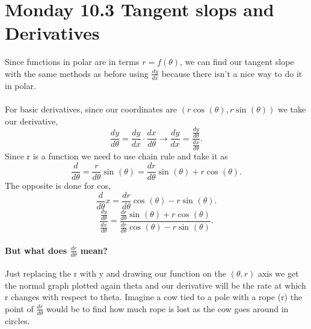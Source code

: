 \section{Monday 10.3 Tangent slops and Derivatives}%
\label{sec:Monday 10.3 Tangent slops and Derivatives}
Since functions in polar are in terms $ r=f\left( \theta \right)  $, we can find our tangent slope with the same methods as before using $ \frac{ dy }{ dx }  $ because there isn't a nice way to do it in polar.\\ \\

For basic derivatives, since our coordinates are $ \left( r\cos^{  } \left( \theta \right) , r\sin^{  } \left( \theta \right)  \right)  $ we take our derivative,
\[
\frac{ dy }{ d\theta} = \frac{ dy }{ dx } \cdot \frac{ dx }{ d\theta }  \to \frac{ dy }{ dx } = \frac{ \frac{ dy }{ d\theta }  }{ \frac{ dx }{ d\theta }  }
.\] 
Since r is a function we need to use chain rule and take it as
\[
\frac{ d }{ d\theta } = \frac{ r }{ d\theta } \sin^{  } \left( \theta \right) = \frac{ dr }{ d\theta } \sin^{  } \left( \theta \right) +r\cos^{  } \left( \theta \right)  
.\] 
The opposite is done for cos,
\[
\frac{ d }{ d\theta } x = \frac{ dr }{ d\theta } \cos^{  } \left( \theta \right) -r\sin^{  } \left( \theta \right) 
.\] 
\[
	\frac{ \frac{ dy }{ d\theta }  }{ \frac{ dx }{ d\theta }  } = \frac{ \frac{ dr }{ d\theta } \sin^{  } \left( \theta \right) +r\cos^{  } \left( \theta \right)  }{ \frac{ dr }{ d\theta } \cos^{  } \left( \theta \right) -r\sin^{  } \left( \theta \right) }
.\] 
\paragraph{But what does $ \frac{ dr }{ d\theta }  $ mean?}
Just replacing the r with y and drawing our function on the $ \left( \theta,r \right)  $ axis we get the normal graph plotted again theta and our derivative will be the rate at which r changes with respect to theta. Imagine a cow tied to a pole with a rope (r) the point of $ \frac{ dr }{ d\theta }  $ would be to find how much rope is lost as the cow goes around in circles.


